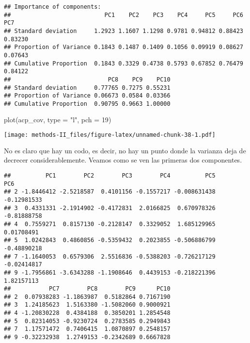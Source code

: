 \documentclass[
]{article}
\newenvironment{Shaded}{\begin{snugshade}}{\end{snugshade}}
\newcommand{\AttributeTok}[1]{\textcolor[rgb]{0.77,0.63,0.00}{#1}}
\newcommand{\DecValTok}[1]{\textcolor[rgb]{0.00,0.00,0.81}{#1}}
\newcommand{\FunctionTok}[1]{\textcolor[rgb]{0.00,0.00,0.00}{#1}}
\newcommand{\NormalTok}[1]{#1}
\newcommand{\SpecialCharTok}[1]{\textcolor[rgb]{0.00,0.00,0.00}{#1}}
\newcommand{\StringTok}[1]{\textcolor[rgb]{0.31,0.60,0.02}{#1}}
\begin{document}
\begin{verbatim}
## Importance of components:
##                           PC1    PC2    PC3    PC4     PC5     PC6     PC7
## Standard deviation     1.2923 1.1607 1.1298 0.9781 0.94812 0.88423 0.83230
## Proportion of Variance 0.1843 0.1487 0.1409 0.1056 0.09919 0.08627 0.07643
## Cumulative Proportion  0.1843 0.3329 0.4738 0.5793 0.67852 0.76479 0.84122
##                            PC8    PC9    PC10
## Standard deviation     0.77765 0.7275 0.55231
## Proportion of Variance 0.06673 0.0584 0.03366
## Cumulative Proportion  0.90795 0.9663 1.00000
\end{verbatim}

\begin{Shaded}
\begin{Highlighting}[]
\FunctionTok{plot}\NormalTok{(acp\_cov, }\AttributeTok{type =} \StringTok{"l"}\NormalTok{, }\AttributeTok{pch =} \DecValTok{19}\NormalTok{)}
\end{Highlighting}
\end{Shaded}

\texttt{[image: methods-II\_files/figure-latex/unnamed-chunk-38-1.pdf]}

No es claro que hay un codo, es decir, no hay un punto donde la varianza
deja de decrecer considerablemente. Veamos como se ven las primeras dos
componentes.

\begin{Shaded}
\end{Shaded}

\begin{verbatim}
##          PC1        PC2        PC3        PC4          PC5         PC6
## 2 -1.8446412 -2.5218587  0.4101156 -0.1557217 -0.008631438 -0.12981533
## 3  0.4331331 -2.1914902 -0.4172831  2.0166825  0.670978326 -0.81888758
## 4  0.7559271  0.8157130 -0.2128147  0.3329052  1.685129965  0.01708491
## 5  1.0242843  0.4860856 -0.5359432  0.2023855 -0.506886799 -0.48890218
## 7 -1.1640053  0.6579306  2.5516836 -0.5388203 -0.726217129 -0.02414817
## 9 -1.7956861 -3.6343288 -1.1908646  0.4439153 -0.218221396  1.82157113
##           PC7        PC8        PC9      PC10
## 2  0.07938283 -1.1863987  0.5182864 0.7167190
## 3  1.24185623  1.5163380 -1.5082060 0.9000921
## 4 -1.20830228  0.4384188  0.3850201 1.2854548
## 5  0.82314053 -0.9230724  0.2783585 0.2949843
## 7  1.17571472  0.7406415  1.0870897 0.2548157
## 9 -0.32232938  1.2749153 -0.2342689 0.6667828
\end{verbatim}
\end{document}
